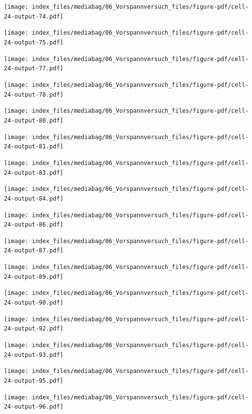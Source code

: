\documentclass[
  11pt,
  letterpaper,
]{scrreprt}
\begin{document}
\newpage{}

\texttt{[image: index\_files/mediabag/06\_Vorspannversuch\_files/figure-pdf/cell-24-output-74.pdf]}

\texttt{[image: index\_files/mediabag/06\_Vorspannversuch\_files/figure-pdf/cell-24-output-75.pdf]}

\newpage{}

\texttt{[image: index\_files/mediabag/06\_Vorspannversuch\_files/figure-pdf/cell-24-output-77.pdf]}

\texttt{[image: index\_files/mediabag/06\_Vorspannversuch\_files/figure-pdf/cell-24-output-78.pdf]}

\newpage{}

\texttt{[image: index\_files/mediabag/06\_Vorspannversuch\_files/figure-pdf/cell-24-output-80.pdf]}

\texttt{[image: index\_files/mediabag/06\_Vorspannversuch\_files/figure-pdf/cell-24-output-81.pdf]}

\newpage{}

\texttt{[image: index\_files/mediabag/06\_Vorspannversuch\_files/figure-pdf/cell-24-output-83.pdf]}

\texttt{[image: index\_files/mediabag/06\_Vorspannversuch\_files/figure-pdf/cell-24-output-84.pdf]}

\newpage{}

\texttt{[image: index\_files/mediabag/06\_Vorspannversuch\_files/figure-pdf/cell-24-output-86.pdf]}

\texttt{[image: index\_files/mediabag/06\_Vorspannversuch\_files/figure-pdf/cell-24-output-87.pdf]}

\newpage{}

\texttt{[image: index\_files/mediabag/06\_Vorspannversuch\_files/figure-pdf/cell-24-output-89.pdf]}

\texttt{[image: index\_files/mediabag/06\_Vorspannversuch\_files/figure-pdf/cell-24-output-90.pdf]}

\newpage{}

\texttt{[image: index\_files/mediabag/06\_Vorspannversuch\_files/figure-pdf/cell-24-output-92.pdf]}

\texttt{[image: index\_files/mediabag/06\_Vorspannversuch\_files/figure-pdf/cell-24-output-93.pdf]}

\newpage{}

\texttt{[image: index\_files/mediabag/06\_Vorspannversuch\_files/figure-pdf/cell-24-output-95.pdf]}

\texttt{[image: index\_files/mediabag/06\_Vorspannversuch\_files/figure-pdf/cell-24-output-96.pdf]}
\end{document}
